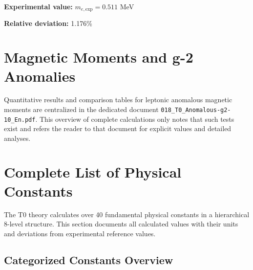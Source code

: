 \documentclass[12pt,a4paper]{report}
\begin{document}
	\textbf{Experimental value:} $m_{e,\text{exp}} = 0.511$ MeV
	
	\textbf{Relative deviation:} 1.176\%
	
	\section{Magnetic Moments and g-2 Anomalies}
	
	Quantitative results and comparison tables for leptonic anomalous magnetic moments are centralized in the dedicated document \texttt{018\_T0\_Anomalous-g2-10\_En.pdf}. This overview of complete calculations only notes that such tests exist and refers the reader to that document for explicit values and detailed analyses.
	
	\section{Complete List of Physical Constants}
	
	The T0 theory calculates over 40 fundamental physical constants in a hierarchical 8-level structure. This section documents all calculated values with their units and deviations from experimental reference values.
	
	\subsection{Categorized Constants Overview}
	
	\begin{table}[h]
		\centering
		\caption{Category-based error statistics of T0 constant calculations}
	\end{table}
	
\end{document}
